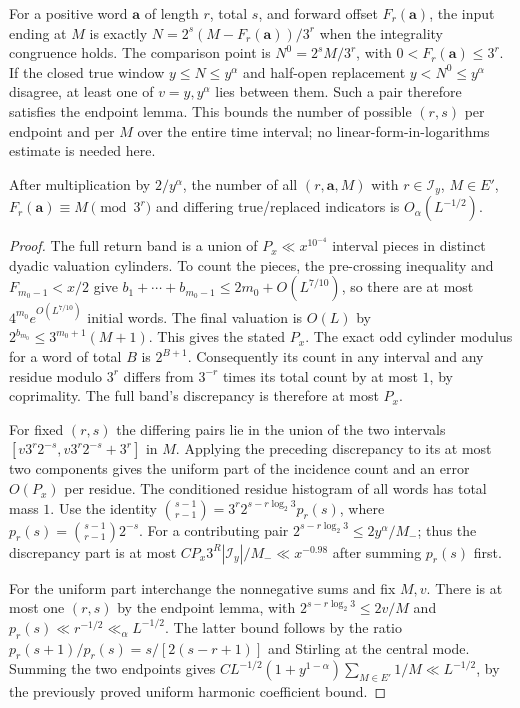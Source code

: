 For a positive word $\mathbf a$ of length $r$, total $s$, and forward
offset $F_r(\mathbf a)$, the input ending at $M$ is exactly
$N=2^s(M-F_r(\mathbf a))/3^r$ when the integrality congruence holds.
The comparison point is $N^0=2^sM/3^r$, with
$0<F_r(\mathbf a)\le3^r$. If the closed true window
$y\le N\le y^\alpha$ and half-open replacement $y<N^0\le y^\alpha$
disagree, at least one of $v=y,y^\alpha$ lies between them. Such a pair
therefore satisfies the endpoint lemma. This bounds the number of
possible $(r,s)$ per endpoint and per $M$ over the entire time interval;
no linear-form-in-logarithms estimate is needed here.

\begin{proposition}
\label{prop:Allikvere-window-replacement}
After multiplication by $2/y^\alpha$, the number of all
$(r,\mathbf a,M)$ with $r\in\mathcal I_y$, $M\in E'$,
$F_r(\mathbf a)\equiv M\pmod{3^r}$ and differing true/replaced indicators
is $O_\alpha(L^{-1/2})$.
\end{proposition}
\begin{proof}
The full return band is a union of $P_x\ll x^{10^{-4}}$ interval pieces
in distinct dyadic valuation cylinders. To count the pieces, the
pre-crossing inequality and $F_{m_0-1}<x/2$ give
$b_1+\cdots+b_{m_0-1}\le2m_0+O(L^{7/10})$, so there are at most
$4^{m_0}e^{O(L^{7/10})}$ initial words. The final valuation is $O(L)$
by $2^{b_{m_0}}\le3^{m_0+1}(M+1)$. This gives the stated $P_x$.
The exact odd cylinder modulus for a word of total $B$ is $2^{B+1}$.
Consequently its count in any interval and any residue modulo $3^r$
differs from $3^{-r}$ times its total count by at most $1$, by coprimality.
The full band's discrepancy is therefore at most $P_x$.

For fixed $(r,s)$ the differing pairs lie in the union of the two
intervals $[v3^r2^{-s},v3^r2^{-s}+3^r]$ in $M$.
Applying the preceding discrepancy to its at most two components gives
the uniform part of the incidence count and an error $O(P_x)$ per residue.
The conditioned residue histogram of all words has total mass $1$.
Use the identity
$\binom{s-1}{r-1}=3^r2^{s-r\log_2 3}p_r(s)$, where
$p_r(s)=\binom{s-1}{r-1}2^{-s}$.
For a contributing pair $2^{s-r\log_2 3}\le2y^\alpha/M_-$;
thus the discrepancy part is at most
$CP_x3^R|\mathcal I_y|/M_-\ll x^{-0.98}$ after summing $p_r(s)$ first.

For the uniform part interchange the nonnegative sums and fix $M,v$.
There is at most one $(r,s)$ by the endpoint lemma, with
$2^{s-r\log_2 3}\le2v/M$ and $p_r(s)\ll r^{-1/2}\ll_\alpha L^{-1/2}$.
The latter bound follows by the ratio
$p_r(s+1)/p_r(s)=s/[2(s-r+1)]$ and Stirling at the central mode.
Summing the two endpoints gives
$CL^{-1/2}(1+y^{1-\alpha})\sum_{M\in E'}1/M\ll L^{-1/2}$,
by the previously proved uniform harmonic coefficient bound.
\end{proof}

